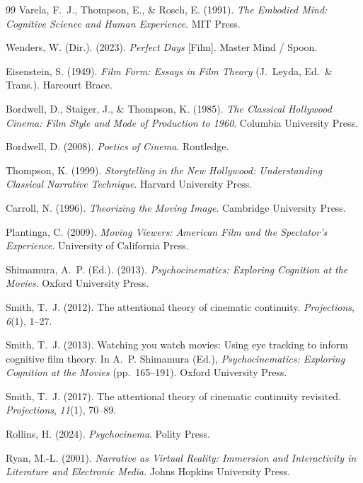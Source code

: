 \documentclass[12pt, a4paper]{article}
\theoremstyle{plain}
\theoremstyle{definition}
\theoremstyle{remark}
\begin{document}
\begin{thebibliography}{99}
Varela, F.~J., Thompson, E., \& Rosch, E. (1991).
\textit{The Embodied Mind: Cognitive Science and Human
Experience}.
MIT Press.


Wenders, W. (Dir.). (2023).
\textit{Perfect Days} [Film].
Master Mind / Spoon.

Eisenstein, S. (1949).
\textit{Film Form: Essays in Film Theory}
(J.~Leyda, Ed.\ \& Trans.).
Harcourt Brace.

Bordwell, D., Staiger, J., \& Thompson, K. (1985).
\textit{The Classical Hollywood Cinema: Film Style and Mode
of Production to 1960}.
Columbia University Press.

Bordwell, D. (2008).
\textit{Poetics of Cinema}.
Routledge.

Thompson, K. (1999).
\textit{Storytelling in the New Hollywood: Understanding
Classical Narrative Technique}.
Harvard University Press.

Carroll, N. (1996).
\textit{Theorizing the Moving Image}.
Cambridge University Press.

Plantinga, C. (2009).
\textit{Moving Viewers: American Film and the Spectator's
Experience}.
University of California Press.

Shimamura, A.~P. (Ed.). (2013).
\textit{Psychocinematics: Exploring Cognition at the Movies}.
Oxford University Press.

Smith, T.~J. (2012).
The attentional theory of cinematic continuity.
\textit{Projections}, \textit{6}(1), 1--27.

Smith, T.~J. (2013).
Watching you watch movies: Using eye tracking to inform
cognitive film theory.
In A.~P. Shimamura (Ed.),
\textit{Psychocinematics: Exploring Cognition at the Movies}
(pp.~165--191).
Oxford University Press.

Smith, T.~J. (2017).
The attentional theory of cinematic continuity revisited.
\textit{Projections}, \textit{11}(1), 70--89.

Rollins, H. (2024).
\textit{Psychocinema}.
Polity Press.


Ryan, M.-L. (2001).
\textit{Narrative as Virtual Reality: Immersion and
Interactivity in Literature and Electronic Media}.
Johns Hopkins University Press.


\end{thebibliography}
\end{document}
